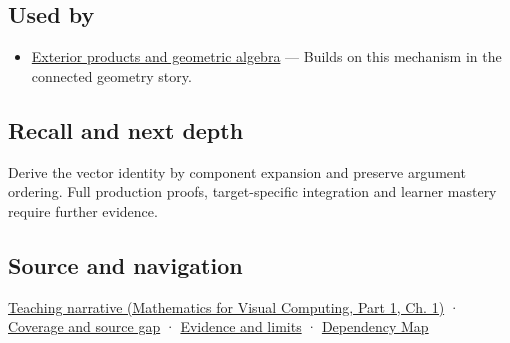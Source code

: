 \subsection{Used by}\label{appendix-5caa058bd9c7-used-by}

\hypertarget{appendix-5caa058bd9c7-used-by}{}

\begin{itemize}
\tightlist
\item
  \hyperref[appendix-e1960925d1b8]{Exterior products and geometric algebra} --- Builds on this mechanism in the connected geometry story.
\end{itemize}

\subsection{Recall and next depth}\label{appendix-5caa058bd9c7-recall-and-next-depth}

\hypertarget{appendix-5caa058bd9c7-recall-and-next-depth}{}

Derive the vector identity by component expansion and preserve argument ordering. Full production proofs, target-specific integration and learner mastery require further evidence.

\subsection{Source and navigation}\label{appendix-5caa058bd9c7-source-and-navigation}

\hypertarget{appendix-5caa058bd9c7-source-and-navigation}{}

\href{../02-Mathematics-for-Visual-Computing-P01/main.pdf\#01-foundations-i-ch017-signed-volume-extends-the-same-idea-into-space}{Teaching narrative (Mathematics for Visual Computing, Part 1, Ch. 1)} · \hyperref[appendix-fd090d982a15-phase-6---parts-501-600]{Coverage and source gap} · \hyperref[appendix-a103e7846d21-phase-6---source-analysis-and-verification]{Evidence and limits} · \hyperref[appendix-4ad47bdd269a]{Dependency Map}
